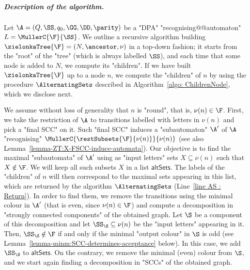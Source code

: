 \documentclass{theoretics}
\begin{document}
\subparagraph*{Description of the algorithm.}
Let $\A=(Q,\SS,q_0,\GG,\DD,\parity)$  be a "DPA"  "recognising@@automaton" $L = \MullerC{\F}{\SS}$. We outline a recursive algorithm  building $\zielonkaTree{\F} = (N, \ancestor, \nu)$ in a top-down fashion; it starts from the "root" of the "tree" (which is always labelled $\SS$), and each time that some node is added to $N$, we compute its "children".
If we have built $\zielonkaTree{\F}$ up to a node $n$, we compute the "children" of $n$ by using the procedure $\AlternatingSets$ described in Algorithm~\ref{algo: ChildrenNode}, which we disclose next. 

We assume without loss of generality that $n$ is "round", that is, $\nu(n)\in \F$. First, we take the restriction of $\A$ to transitions labelled with letters in $\nu(n)$ and pick a "final SCC" on it. Such "final SCC" induces a "subautomaton" $\A'$ of $\A$ "recognising" $\MullerC{\restSubsets{\F}{\nu(n)}}{\nu(n)}$ (see also Lemma~\ref{lemma-ZT:X-FSCC-induce-automata}).
Our objective is to find the maximal "subautomata" of $\A'$ using as "input letters" sets $X\subseteq \nu(n)$ such that $X\notin \F$. We will keep all such subsets $X$ in a list $\mathsf{altSets}$. The labels of the "children" of $n$ will then correspond to the maximal sets appearing  in this list, which are returned by the algorithm $\AlternatingSets$ (Line~\ref{line AS : Return}).
In order to find them, we remove the transitions using the minimal colour in $\A'$ (that is even, since $\nu(n)\in \F$) and compute a decomposition in "strongly connected components" of the obtained graph.
Let $\S$ be a component of this decomposition and let $\SS_\S\subseteq \nu(n)$ be the "input letters" appearing in it. Then, $\SS_\S\notin \F$ if and only if  the minimal "output colour" in $\S$ is odd (see Lemma~\ref{lemma-minm:SCC-determines-acceptance} below). In this case, we add $\SS_\S$ to $\mathsf{altSets}$. On the contrary, we remove the minimal (even) colour from $\S$, and we start again finding a decomposition in "SCCs" of the obtained graph.
\end{document}
